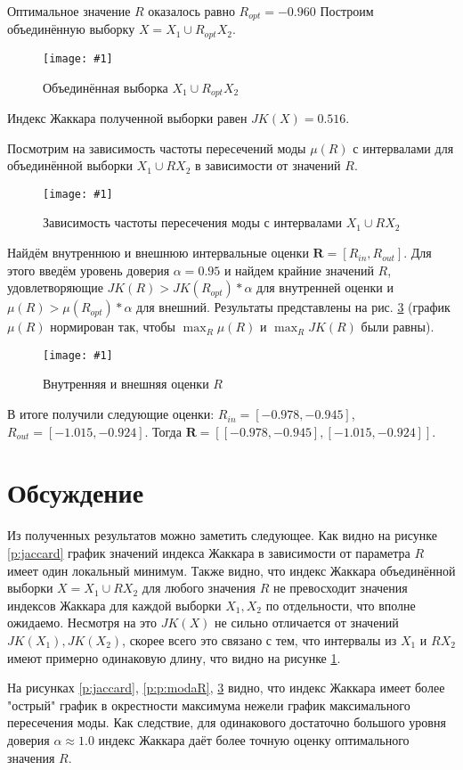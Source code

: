 \documentclass[a4paper,12pt]{article}
\newcommand{\plot}[3]{
    \begin{figure}[H]
        \begin{center}
            \texttt{[image: \#1]}
            \caption{#2}
            \label{#3}
        \end{center}
    \end{figure}
}
\begin{document}
    Оптимальное значение $ R $ оказалось равно $ R_{opt} = -0.960 $
    Построим объединённую выборку $ X = X_1 \cup R_{opt} X_2 $.
    \plot{_X1RX2}{Объединённая выборка $ X_1 \cup R_{opt} X_2 $}{p:x1rx2}

    Индекс Жаккара полученной выборки равен $ JK(X) = 0.516 $.

    Посмотрим на зависимость частоты пересечений моды $ \mu(R) $ с интервалами
    для объединённой выборки $ X_1 \cup R X_2 $ в зависимости от значений $ R $.
    \plot{_ModaR}{Зависимость частоты пересечения моды с интервалами $ X_1 \cup R X_2 $}{p:modaR}

    Найдём внутреннюю и внешнюю интервальные оценки $ \textbf{R} = [R_{in}, R_{out}] $.
    Для этого введём уровень доверия $ \alpha = 0.95 $ и найдем крайние значений $ R $,
    удовлетворяющие $ JK(R) > JK(R_{opt}) * \alpha $ для внутренней оценки
    и $ \mu(R) > \mu(R_{opt}) * \alpha $ для внешний.
    Результаты представлены на рис. \ref{p:InnerOuter}
    (график $ \mu(R) $ нормирован так, чтобы $ \max_R{\mu(R)} $ и $ \max_R{JK(R)} $ были равны).
    \plot{_InnerOuter}{Внутренняя и внешняя оценки $ R $}{p:InnerOuter} 

    В итоге получили следующие оценки: $ R_{in} = [-0.978, -0.945] $,
    $ R_{out} = [-1.015, -0.924] $. Тогда $ \textbf{R} = [[-0.978, -0.945], [-1.015, -0.924]] $.

    \section{Обсуждение}
    \quad Из полученных результатов можно заметить следующее.
    Как видно на рисунке \ref{p:jaccard} график значений индекса Жаккара
    в зависимости от параметра $ R $ имеет один локальный минимум.
    Также видно, что индекс Жаккара объединённой выборки $ X = X_1 \cup R X_2 $ для любого значения $ R $
    не превосходит значения индексов Жаккара для каждой выборки $ X_1, X_2 $ по отдельности, что вполне ожидаемо.
    Несмотря на это $ JK(X) $ не сильно отличается от значений $ JK(X_1), JK(X_2) $,
    скорее всего это связано с тем, что интервалы из $ X_1 $ и $ R X_2 $ имеют примерно одинаковую длину,
    что видно на рисунке \ref{p:x1rx2}.

    На рисунках \ref{p:jaccard}, \ref{p:p:modaR}, \ref{p:InnerOuter} видно,
    что индекс Жаккара имеет более "острый" график в окрестности максимума
    нежели график максимального пересечения моды.
    Как следствие, для одинакового достаточно большого уровня доверия $ \alpha \approx 1.0 $
    индекс Жаккара даёт более точную оценку оптимального значения $ R $. 
\end{document}
